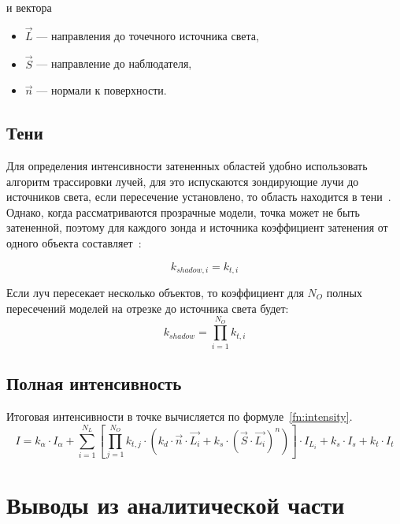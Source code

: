 и вектора
\begin{itemize}
	\item $\vec{L}$ --- направления до точечного источника света,
	\item $\vec{S}$ --- направление до наблюдателя,
	\item $\vec{n}$ --- нормали к поверхности.
\end{itemize}

\subsection{Тени}

Для определения интенсивности затененных областей удобно использовать алгоритм трассировки лучей, для это испускаются зондирующие лучи до источников света, если пересечение установлено, то область находится в тени~\cite[с.~517]{rogers-book}. Однако, когда рассматриваются прозрачные модели, точка может не быть затененной, поэтому для каждого зонда и источника коэффициент затенения от одного объекта составляет~\cite[с.~368]{cg-priciples}:

\begin{equation}
	k_{shadow,i} = k_{t, i}
\end{equation} 

Если луч пересекает несколько объектов, то коэффициент для $N_O$ полных пересечений моделей на отрезке до источника света будет:
\begin{equation}
	k_{shadow} = \prod_{i=1}^{N_O} k_{t, i}
\end{equation}

\subsection{Полная интенсивность}

Итоговая интенсивности в точке вычисляется по формуле~\ref{fn:intensity}.
\begin{equation} \label{fn:intensity}
		I = k_{\alpha} \cdot I_{\alpha} + 
		\sum_{i=1}^{N_L} \left[
			\prod_{j=1}^{N_O}	k_{t, j} \cdot 
			(k_d \cdot \vec{n} \cdot \vec{L_i} + k_s \cdot (\vec{S} \cdot \vec{L_i}) ^ n) 
		\right] \cdot I_{L_i} + 
		k_s \cdot I_s + 
		k_t \cdot I_t
\end{equation}

\section{Выводы из аналитической части}

\clearpage
